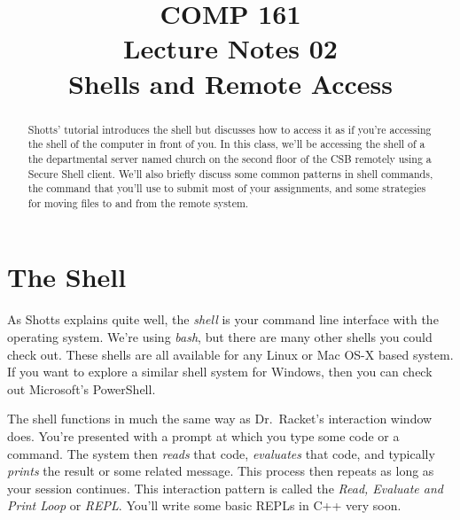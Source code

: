 \documentclass[nobib]{tufte-handout}
\title{COMP 161 \\ Lecture Notes 02 \\ Shells and Remote Access}
\begin{document}
\maketitle

\begin{abstract}
Shotts' tutorial introduces the shell but discusses how to access it as if you're accessing the shell of the computer in front of you.  In this class, we'll be accessing the shell of a the departmental server named church on the second floor of the CSB remotely using a Secure Shell client. We'll also briefly discuss some common patterns in shell commands, the command that you'll use to submit most of your assignments, and some strategies for moving files to and from the remote system.
\end{abstract}

\section{The Shell}

As Shotts explains quite well, the \textit{shell} is your command line interface with the operating system.  We're using \textit{bash}, but there are many other shells you could check out.  These shells are all available for any Linux or Mac OS-X based system. If you want to explore a similar shell system for Windows, then you can check out Microsoft's PowerShell.

The shell functions in much the same way as Dr.\ Racket's interaction window does. You're presented with a prompt at which you type some code or a command. The system then \textit{reads} that code, \textit{evaluates} that code, and typically \textit{prints} the result or some related message. This process then repeats as long as your session continues. This interaction pattern is called the \textit{Read, Evaluate and Print Loop} or \textit{REPL}. You'll write some basic REPLs in C++ very soon.
\end{document}
